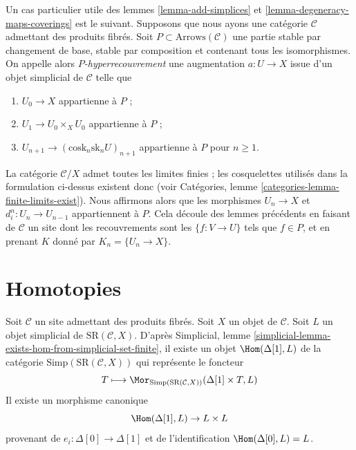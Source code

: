 \begin{remark}
\label{remark-P-covering}
Un cas particulier utile des lemmes \ref{lemma-add-simplices} et
\ref{lemma-degeneracy-maps-coverings} est le suivant.
Supposons que nous ayons une catégorie $\mathcal{C}$ admettant des produits fibrés.
Soit $P \subset \text{Arrows}(\mathcal{C})$ une partie
stable par changement de base, stable par composition
et contenant tous les isomorphismes. On appelle alors
{\it $P$-hyperrecouvrement} une augmentation $a : U \to X$
issue d'un objet simplicial de $\mathcal{C}$ telle que
\begin{enumerate}
\item $U_0 \to X$ appartienne à $P$ ;
\item $U_1 \to U_0 \times_X U_0$ appartienne à $P$ ;
\item $U_{n + 1} \to (\text{cosk}_n\text{sk}_n U)_{n + 1}$
appartienne à $P$ pour $n \geq 1$.
\end{enumerate}
La catégorie $\mathcal{C}/X$ admet toutes les limites finies ; les
cosquelettes utilisés dans la formulation ci-dessus existent donc
(voir Catégories, lemme \ref{categories-lemma-finite-limits-exist}).
Nous affirmons alors que les morphismes $U_n \to X$ et $d^n_i : U_n \to U_{n - 1}$
appartiennent à $P$. Cela découle des lemmes
précédents en faisant de $\mathcal{C}$ un site dont les recouvrements
sont les $\{f : V \to U\}$ tels que $f \in P$, et en prenant $K$ donné par
$K_n = \{U_n \to X\}$.
\end{remark}


\section{Homotopies}
\label{section-homotopies}

\noindent
Soit $\mathcal{C}$ un site admettant des produits fibrés.
Soit $X$ un objet de $\mathcal{C}$.
Soit $L$ un objet simplicial de $\text{SR}(\mathcal{C}, X)$.
D'après
Simplicial, lemme \ref{simplicial-lemma-exists-hom-from-simplicial-set-finite},
il existe un objet $\Hom(\Delta[1], L)$
de la catégorie $\text{Simp}(\text{SR}(\mathcal{C}, X))$ qui représente le
foncteur
$$
T
\longmapsto
\Mor_{\text{Simp}(\text{SR}(\mathcal{C}, X))}(\Delta[1] \times T, L)
$$
Il existe un morphisme canonique
$$
\Hom(\Delta[1], L) \to L \times L
$$
provenant de $e_i : \Delta[0] \to \Delta[1]$ et de l'identification
$\Hom(\Delta[0], L) = L$.

